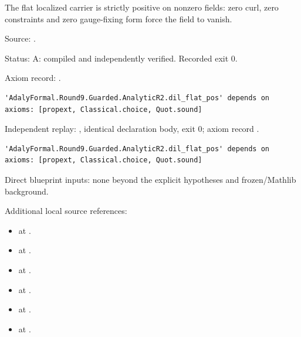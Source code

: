 \begin{theorem}[bp-091]
\label{bp-091}
\uses{}
\leanok
The flat localized carrier is strictly positive on nonzero fields: zero curl, zero constraints and zero gauge-fixing form force the field to vanish.

\par Source: \texttt{}.
\par Status: A: compiled and independently verified. Recorded exit 0.
\par Axiom record: \texttt{}.
\begin{verbatim}
'AdalyFormal.Round9.Guarded.AnalyticR2.dil_flat_pos' depends on axioms: [propext, Classical.choice, Quot.sound]
\end{verbatim}
\par Independent replay: \texttt{}, identical declaration body, exit 0; axiom record \texttt{}.
\begin{verbatim}
'AdalyFormal.Round9.Guarded.AnalyticR2.dil_flat_pos' depends on axioms: [propext, Classical.choice, Quot.sound]
\end{verbatim}
\par Direct blueprint inputs: none beyond the explicit hypotheses and frozen/Mathlib background.
\par Additional local source references:
\begin{itemize}
\item \texttt{} at \texttt{}.
\item \texttt{} at \texttt{}.
\item \texttt{} at \texttt{}.
\item \texttt{} at \texttt{}.
\item \texttt{} at \texttt{}.
\item \texttt{} at \texttt{}.

\end{itemize}
\end{theorem}
